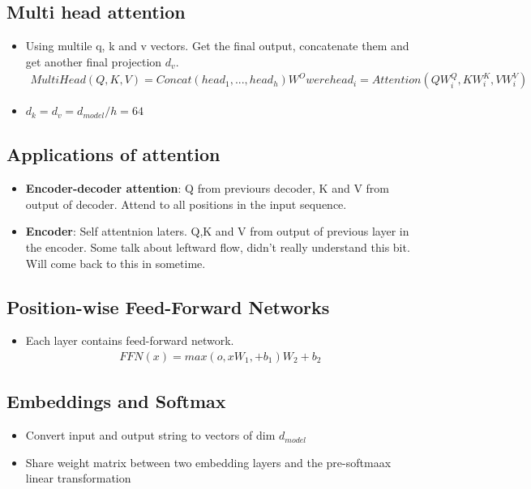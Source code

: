 \documentclass[a4paper]{article}
\begin{document}
\subsection{Multi head attention}
\begin{itemize}
    \item Using multile q, k and v vectors. Get the final output, concatenate them and get another final projection $d_{v}$.
    \begin{equation}
    \begin{split}
        MultiHead(Q,K,V) = Concat(head_1,...,head_h)W^O
        were head_i = Attention(QW_{i}^{Q}, KW_{i}^{K},VW_{i}^{V})
    \end{split}
    \end{equation}
\item $d_{k} = d_{v} = d_{model}/h = 64$
\end{itemize}
\subsection{Applications of attention}
\begin{itemize}
    \item \textbf{Encoder-decoder attention}: Q from previours decoder, K and V from output of decoder. Attend to all positions in the input sequence. 
    \item \textbf{Encoder}: Self attentnion laters. Q,K and V from output of previous layer in the encoder. Some talk about leftward flow, didn't really understand this bit.  Will come back to this in sometime.
\end{itemize}
\subsection{Position-wise Feed-Forward Networks}
\begin{itemize}
    \item Each layer contains feed-forward network.
    \begin{equation}
    \begin{split}
        FFN(x) = max(o, xW_1,+ b_1)W_2 + b_2
    \end{split}
    \end{equation}
\end{itemize}
\subsection{Embeddings and Softmax}
\begin{itemize}
    \item Convert input and output string to vectors of dim $d_{model}$
    \item Share weight matrix between two embedding layers and the pre-softmaax linear transformation
\end{itemize}
\end{document}
